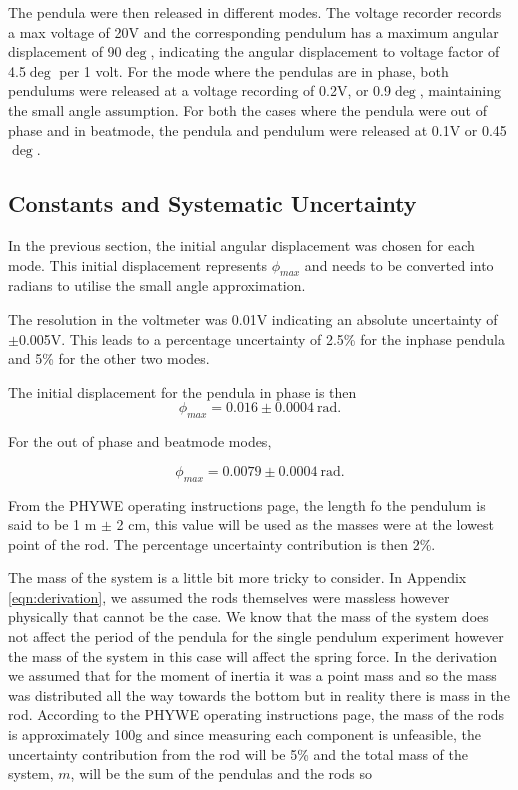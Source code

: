 \documentclass{article}
\begin{document}
The pendula were then released in different modes. The voltage recorder records a 
max voltage of 20V and the corresponding pendulum has a maximum angular displacement
of 90$\deg$, indicating the angular displacement to voltage factor of 4.5$\deg$ per
1 volt. For the mode where the pendulas are in phase, both pendulums were released 
at a voltage recording of 0.2V, or 0.9$\deg$, maintaining the small angle assumption.
For both the cases where the pendula were out of phase and in beatmode, the pendula
and pendulum were released at 0.1V or 0.45$\deg$.

\subsection{Constants and Systematic Uncertainty} \label{eqn:sys}
In the previous section, the initial angular displacement was chosen for each mode.
This initial displacement represents $\phi_{max}$ and needs to be converted into radians
to utilise the small angle approximation. 

The resolution in the voltmeter was 0.01V indicating an absolute uncertainty of $\pm$0.005V.
This leads to a percentage uncertainty of 2.5\% for the inphase pendula and 5\% for the other
two modes.

The initial displacement for the pendula in phase is then
\begin{equation}
    \phi_{max} = 0.016 \pm 0.0004 \: \text{rad}.
\end{equation}

For the out of phase and beatmode modes, 

\begin{equation}
    \phi_{max} = 0.0079 \pm 0.0004 \: \text{rad}.
\end{equation}

From the PHYWE operating instructions page, the length fo the pendulum is said to be 1 m 
$\pm$ 2 cm, this value will be used as the masses were at the lowest point of the rod. The
percentage uncertainty contribution is then 2\%.

The mass of the system is a little bit more tricky to consider. In Appendix \ref{eqn:derivation},
we assumed the rods themselves were massless however physically that cannot be the case. We 
know that the mass of the system does not affect the period of the pendula for the single pendulum
experiment however the mass of the system in this case will affect the spring force. In the 
derivation we assumed that for the moment of inertia it was a point mass and so the mass was 
distributed all the way towards the bottom but in reality there is mass in the rod. According
to the PHYWE operating instructions page, the mass of the rods is approximately 100g and since 
measuring each component is unfeasible, the uncertainty contribution from the rod will be 5\% and
the total mass of the system, $m$, will be the sum of the pendulas and the rods so
\end{document}
